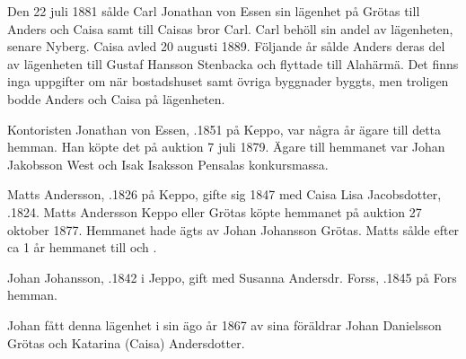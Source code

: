 Den 22 juli 1881 sålde Carl Jonathan von Essen sin lägenhet på Grötas till Anders och Caisa samt till Caisas bror Carl. Carl behöll sin andel av lägenheten, senare Nyberg. Caisa avled 20 augusti 1889. Följande år sålde Anders deras del av lägenheten till Gustaf Hansson Stenbacka och flyttade till Alahärmä. Det finns inga uppgifter om när bostadshuset samt övriga byggnader byggts, men troligen bodde Anders och Caisa på lägenheten.


%
Kontoristen Jonathan von Essen, .1851 på Keppo, var några år ägare till detta hemman. Han köpte det på auktion 7 juli 1879. Ägare till hemmanet var Johan Jakobsson West och Isak Isaksson Pensalas konkursmassa.


%
Matts Andersson, .1826 på Keppo, gifte sig 1847 med Caisa Lisa Jacobsdotter, .1824. Matts Andersson Keppo eller Grötas köpte hemmanet på auktion 27 oktober 1877. Hemmanet hade ägts av Johan Johansson Grötas. Matts sålde efter ca 1 år hemmanet till  och .


%
Johan Johansson, .1842 i Jeppo, gift med Susanna Andersdr. Forss, .1845 på Fors hemman.
\begin{jhchildren}
  \item {}
  \item {}
  \item {}
  \item {}
  \item {}
  \item {}
\end{jhchildren}

Johan fått denna lägenhet i sin ägo år 1867 av sina föräldrar Johan	Danielsson Grötas och Katarina (Caisa) Andersdotter.



